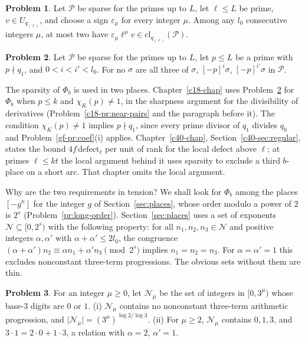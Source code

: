 \documentclass[reqno]{amsart}
\newcounter{chap}
\theoremstyle{definition}
\newtheorem{problem}{Problem}[section]
\theoremstyle{plain}
\newcommand{\Pc}{\mathcal{P}}
\newcommand{\Nc}{\mathcal{N}}
\begin{document}
\begin{problem}\label{pr:short-orbit}
Let \(\Pc\) be sparse for the primes up to \(L\), let \(\ell \le L\) be prime, \(v \in U_{q_{(\ell)}}\), and choose a sign \(\varepsilon_\mu\) for every integer \(\mu\).  Among any \(l_0\) consecutive integers \(\mu\), at most two have \(\varepsilon_\mu\ell^\mu v \in \mathrm{cl}_{q_{(\ell)}}(\Pc)\).
\end{problem}

\begin{problem}\label{pr:near-pairs}
Let \(\Pc\) be sparse for the primes up to \(L\), let \(p \le L\) be a prime with \(p \nmid q_1\), and \(0 < i < i' < l_0\).  For no \(\sigma\) are all three of \(\sigma\), \([-p]^i\sigma\), \([-p]^{i'}\sigma\) in \(\Pc\).
\end{problem}

The sparsity of \(\Phi_b\) is used in two places.  Chapter~\ref{c18-chap} uses Problem~\ref{pr:near-pairs} for \(\Phi_b\) when \(p \le k\) and \(\chi_K(p) \ne 1\), in the sharpness argument for the divisibility of derivatives (Problem~\ref{c18-pr:near-pairs} and the paragraph before it).  The condition \(\chi_K(p) \ne 1\) implies \(p \nmid q_1\), since every prime divisor of \(q_1\) divides \(q_0\) and Problem~\ref{gf-pr:coef}(i) applies.  Chapter~\ref{c40-chap}, Section~\ref{c40-sec:regular}, states the bound \(4f\,\mathrm{defect}_\ell\) per unit of rank for the local defect above \(\ell\); at primes \(\ell \le kt\) the local argument behind it uses sparsity to exclude a third \(b\)-place on a short arc.  That chapter omits the local argument.

Why are the two requirements in tension?  We shall look for \(\Phi_b\) among the places \([-g^n]\) for the integer \(g\) of Section~\ref{sec:places}, whose order modulo a power of \(2\) is \(2^s\) (Problem~\ref{pr:long-order}).  Section~\ref{sec:places} uses a set of exponents \(\Nc \subseteq [0, 2^s)\) with the following property: for all \(n_1, n_2, n_3 \in \Nc\) and positive integers \(\alpha, \alpha'\) with \(\alpha + \alpha' \le 2l_0\), the congruence \((\alpha+\alpha')n_2 \equiv \alpha n_1 + \alpha' n_3 \pmod{2^s}\) implies \(n_1 = n_2 = n_3\).  For \(\alpha = \alpha' = 1\) this excludes nonconstant three-term progressions.  The obvious sets without them are thin.

\begin{problem}\label{pr:base3}
For an integer \(\mu \ge 0\), let \(\Nc_\mu\) be the set of integers in \([0, 3^\mu)\) whose base-\(3\) digits are \(0\) or \(1\).  (i) \(\Nc_\mu\) contains no nonconstant three-term arithmetic progression, and \(\lvert \Nc_\mu\rvert = (3^\mu)^{\log 2/\log 3}\).  (ii) For \(\mu \ge 2\), \(\Nc_\mu\) contains \(0, 1, 3\), and \(3 \cdot 1 = 2 \cdot 0 + 1 \cdot 3\), a relation with \(\alpha = 2\), \(\alpha' = 1\).
\end{problem}
\end{document}

